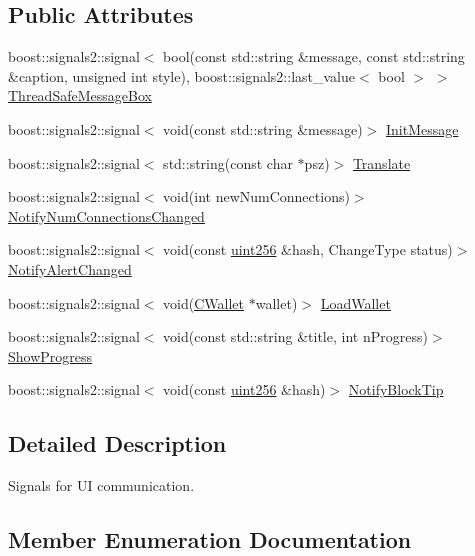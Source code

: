 \subsection*{Public Attributes}
\begin{DoxyCompactItemize}
\item 
boost\+::signals2\+::signal$<$ bool(const std\+::string \&message, const std\+::string \&caption, unsigned int style), boost\+::signals2\+::last\+\_\+value$<$ bool $>$ $>$ \mbox{\hyperlink{class_c_client_u_i_interface_a93e77ea8828d8d960348cf4648b7f374}{Thread\+Safe\+Message\+Box}}
\item 
boost\+::signals2\+::signal$<$ void(const std\+::string \&message)$>$ \mbox{\hyperlink{class_c_client_u_i_interface_a6192529915a5766d8f50ab642a278a26}{Init\+Message}}
\item 
boost\+::signals2\+::signal$<$ std\+::string(const char $\ast$psz)$>$ \mbox{\hyperlink{class_c_client_u_i_interface_a6e1e57cb42e3a1a0b133745a897cf8ed}{Translate}}
\item 
boost\+::signals2\+::signal$<$ void(int new\+Num\+Connections)$>$ \mbox{\hyperlink{class_c_client_u_i_interface_a6b0c2f21bb930d5a4e34244af6a0a3b5}{Notify\+Num\+Connections\+Changed}}
\item 
boost\+::signals2\+::signal$<$ void(const \mbox{\hyperlink{classuint256}{uint256}} \&hash, Change\+Type status)$>$ \mbox{\hyperlink{class_c_client_u_i_interface_ab633d1e727230ae86cae059dc4bc79f1}{Notify\+Alert\+Changed}}
\item 
boost\+::signals2\+::signal$<$ void(\mbox{\hyperlink{class_c_wallet}{C\+Wallet}} $\ast$wallet)$>$ \mbox{\hyperlink{class_c_client_u_i_interface_ac3755a3740bc70e69d81d7905a57faa6}{Load\+Wallet}}
\item 
boost\+::signals2\+::signal$<$ void(const std\+::string \&title, int n\+Progress)$>$ \mbox{\hyperlink{class_c_client_u_i_interface_a2190089fbdfd78221c4b74ca98e96e01}{Show\+Progress}}
\item 
boost\+::signals2\+::signal$<$ void(const \mbox{\hyperlink{classuint256}{uint256}} \&hash)$>$ \mbox{\hyperlink{class_c_client_u_i_interface_ab12afb3c938ce8754dcf5ee6ade4cc03}{Notify\+Block\+Tip}}
\end{DoxyCompactItemize}


\subsection{Detailed Description}
Signals for UI communication. 

\subsection{Member Enumeration Documentation}
\mbox{\label{class_c_client_u_i_interface_a568cf07ecac3fac224d63b42a32e8bc1}} 
